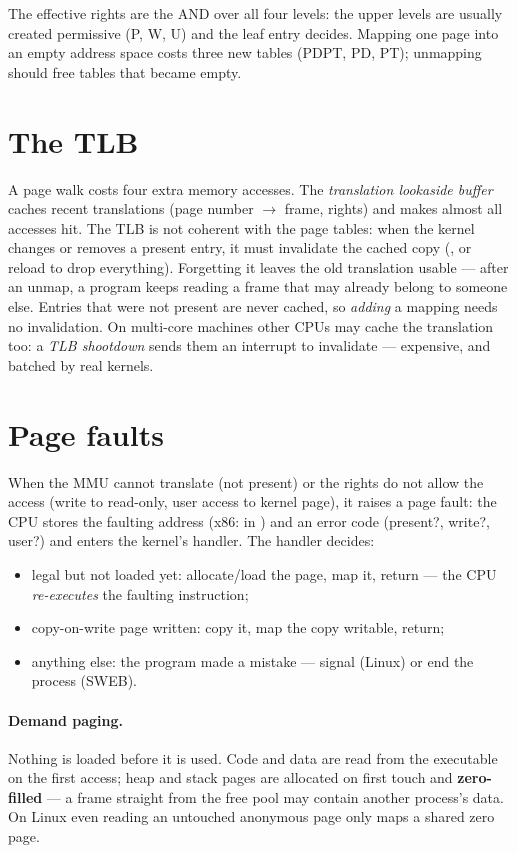 The effective rights are the AND over all four levels: the upper levels
are usually created permissive (P, W, U) and the leaf entry decides.
Mapping one page into an empty address space costs three new tables
(PDPT, PD, PT); unmapping should free tables that became empty.

\section{The TLB}

A page walk costs four extra memory accesses. The \emph{translation
lookaside buffer} caches recent translations (page number $\to$ frame,
rights) and makes almost all accesses hit. The TLB is not coherent with
the page tables: when the kernel changes or removes a present entry, it
must invalidate the cached copy (, or reload 
to drop everything). Forgetting it leaves the old translation usable ---
after an unmap, a program keeps reading a frame that may already belong to
someone else. Entries that were not present are never cached, so
\emph{adding} a mapping needs no invalidation. On multi-core machines
other CPUs may cache the translation too: a \emph{TLB shootdown} sends
them an interrupt to invalidate --- expensive, and batched by real
kernels.

\section{Page faults}

When the MMU cannot translate (not present) or the rights do not allow
the access (write to read-only, user access to kernel page), it raises a
page fault: the CPU stores the faulting address (x86: in ) and
an error code (present?, write?, user?) and enters the kernel's handler.
The handler decides:

\begin{itemize}
  \item legal but not loaded yet: allocate/load the page, map it, return
    --- the CPU \emph{re-executes} the faulting instruction;
  \item copy-on-write page written: copy it, map the copy writable, return;
  \item anything else: the program made a mistake --- signal
     (Linux) or end the process (SWEB).
\end{itemize}

\paragraph{Demand paging.} Nothing is loaded before it is used. Code
and data are read from the executable on the first access; heap and stack
pages are allocated on first touch and \textbf{zero-filled} --- a frame
straight from the free pool may contain another process's data. On Linux
even reading an untouched anonymous page only maps a shared zero page.

